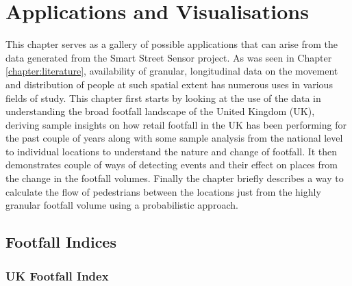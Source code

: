 \chapter{Applications and Visualisations} \label{chapter:applications}

\vspace{-0.5cm}
This chapter serves as a gallery of possible applications that can arise from the data generated from the Smart Street Sensor project. 
As was  seen in Chapter \ref{chapter:literature}, availability of granular, longitudinal data on the movement and distribution of people at such spatial extent has numerous uses in various fields of study. 
This chapter first starts by looking at the use of the data in understanding the broad footfall landscape of the United Kingdom (UK), deriving sample insights on how retail footfall in the UK has been performing for the past couple of years along with some sample analysis from the national level to individual locations to understand the nature and change of footfall.
It then demonstrates couple of ways of detecting events and their effect on places from the change in the footfall volumes.
Finally the chapter briefly describes a way to calculate the flow of pedestrians between the locations just from the highly granular footfall volume using a probabilistic approach.

\section{Footfall Indices}
\subsection{UK Footfall Index}

